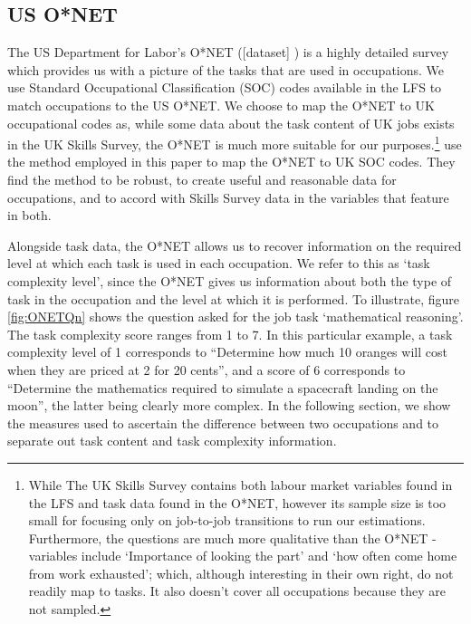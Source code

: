 \documentclass[12pt,authoryear]{elsarticle}
\begin{document}
 



	
	
	\subsection{US O*NET}
	\label{sec:ONET}
	
	The US Department for Labor's O*NET ([dataset] \cite{ONET}) is a highly detailed survey which provides us with a picture of the tasks that are used in occupations. We use Standard Occupational Classification (SOC) codes available in the LFS to match occupations to the US O*NET. We choose to map the O*NET to UK occupational codes as, while some data about the task content of UK jobs exists in the UK Skills Survey, the O*NET is much more suitable for our purposes.\footnote{While The UK Skills Survey contains both labour market variables found in the LFS and task data found in the O*NET, however its sample size is too small for focusing only on job-to-job transitions to run our estimations. Furthermore, the questions are much more qualitative than the O*NET - variables include `Importance of looking the part' and `how often come home from work exhausted'; which, although interesting in their own right, do not readily map to tasks. It also doesn't cover all occupations because they are not sampled.} \cite{ONETreport} use the method employed in this paper to map the O*NET to UK SOC codes. They find the method to be robust, to create useful and reasonable data for occupations, and to accord with Skills Survey data in the variables that feature in both.
	
	\vspace{2mm}
	
	Alongside task data, the O*NET allows us to recover information on the required level at which each task is used in each occupation. We refer to this as `task complexity level', since the O*NET gives us information about both the type of task in the occupation and the level at which it is performed. To illustrate, figure \ref{fig:ONETQn} shows the question asked for the job task `mathematical reasoning'. The task complexity score ranges from 1 to 7. In this particular example, a task complexity level of 1 corresponds to ``Determine how much 10 oranges will cost when they are priced at 2 for 20 cents'', and a score of 6 corresponds to ``Determine the mathematics required to simulate a spacecraft landing on the moon'', the latter being clearly more complex. In the following section, we show the measures used to ascertain the difference between two occupations and to separate out task content and task complexity information. 
	
\end{document}
